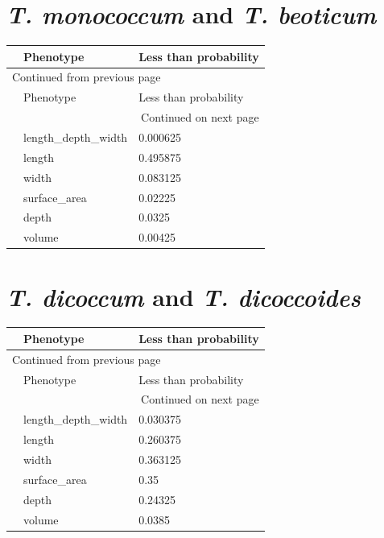 \documentclass[11pt]{report}
\begin{document}
\section{\emph{T. monococcum} and \emph{T. beoticum}}
\label{sec:org0eb14e9}
\begin{longtable}{l|l|l}
 & Phenotype & Less than probability\\
\hline
\endfirsthead
\multicolumn{3}{l}{Continued from previous page} \\
\hline

 & Phenotype & Less than probability \\

\hline
\endhead
\hline\multicolumn{3}{r}{Continued on next page} \\
\endfoot
\endlastfoot
\hline
 & length\_depth\_width & 0.000625\\
 & length & 0.495875\\
 & width & 0.083125\\
 & surface\_area & 0.02225\\
 & depth & 0.0325\\
 & volume & 0.00425\\
\end{longtable}

\section{\emph{T. dicoccum} and \emph{T. dicoccoides}}
\label{sec:orgace572f}
\begin{longtable}{l|l|l}
 & Phenotype & Less than probability\\
\hline
\endfirsthead
\multicolumn{3}{l}{Continued from previous page} \\
\hline

 & Phenotype & Less than probability \\

\hline
\endhead
\hline\multicolumn{3}{r}{Continued on next page} \\
\endfoot
\endlastfoot
\hline
 & length\_depth\_width & 0.030375\\
 & length & 0.260375\\
 & width & 0.363125\\
 & surface\_area & 0.35\\
 & depth & 0.24325\\
 & volume & 0.0385\\
\end{longtable}
\end{document}
